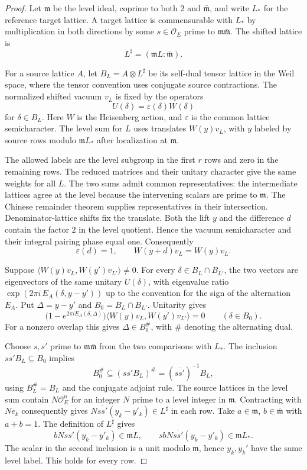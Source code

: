 \begin{proof}
Let \(\mathfrak m\) be the level ideal, coprime to both
\(2\) and \(\bar{\mathfrak m}\), and write \(L_*\) for the reference
target lattice. A target lattice is commensurable with
\(L_*\) by multiplication in both directions by some
\(s\in\mathcal O_E\) prime to \(\mathfrak m\bar{\mathfrak m}\).
The shifted lattice is
\[
 L^{\sharp}=(\mathfrak m L:\bar{\mathfrak m}).
\]

For a source lattice \(A\), let
\(B_L=A\otimes L^{\sharp}\) be its self-dual tensor lattice
in the Weil space, where the tensor convention uses
conjugate source contractions. The normalized shifted
vacuum \(v_L\) is fixed by the operators
\[
 U(\delta)=\varepsilon(\delta)W(\delta)
\]
for
\(\delta\in B_L\). Here \(W\) is the Heisenberg action,
and \(\varepsilon\) is the common lattice semicharacter.
The level sum for \(L\) uses translates \(W(y)v_L\),
with \(y\) labeled by source rows modulo \(\mathfrak m L_*\)
after localization at \(\mathfrak m\).

The allowed labels
are the level subgroup in the first \(r\) rows and zero
in the remaining rows. The reduced matrices and their
unitary character give the same weights for all \(L\).
The two sums admit common representatives: the intermediate lattices agree at the level because the intervening scalars are prime to \(\mathfrak m\). The Chinese remainder theorem supplies representatives in their intersection. Denominator-lattice shifts fix the translate. Both the lift \(y\) and the difference \(d\) contain the factor \(2\) in the level quotient. Hence the vacuum semicharacter and their integral pairing phase equal one. Consequently
\[
 \varepsilon(d)=1,\qquad W(y+d)v_L=W(y)v_L.
\]


Suppose \(\langle W(y)v_L,W(y')v_{L'}\rangle\ne0\). For every
\(\delta\in B_L\cap B_{L'}\), the two vectors are eigenvectors
of the same unitary \(U(\delta)\), with eigenvalue ratio
\(\exp(2\pi i\, E_A(\delta,y-y'))\) up to the convention for
the sign of the alternation \(E_A\). Put \(\Delta=y-y'\) and \(B_0=B_L\cap B_{L'}\).
Unitarity gives
\[
 \bigl(1-e^{2\pi i E_A(\delta,\Delta)}\bigr)
         \langle W(y)v_L,W(y')v_{L'}\rangle=0
       \qquad(\delta\in B_0).
\]
For a nonzero overlap this gives
\(\Delta\in B_0^\#\), with \(\#\) denoting the alternating
dual.

Choose \(s,s'\) prime to \(\mathfrak m\bar{\mathfrak m}\)
from the two comparisons with \(L_*\). The inclusion
\(ss' B_L\subseteq B_0\) implies
\[
 B_0^\#\subseteq(ss' B_L)^\#
             =(\overline{ss'})^{-1}B_L ,
\]
using \(B_L^\#=B_L\) and the conjugate adjoint rule. The source lattices in the
level sum contain \(N\mathcal O_E^n\) for an integer \(N\)
prime to a level integer in \(\mathfrak m\).
Contracting with \(Ne_k\) consequently gives
\(N\overline{ss'}(y_k-y'_k)\in L^{\sharp}\) in each row.
Take \(a\in\mathfrak m\), \(b\in\bar{\mathfrak m}\) with
\(a+b=1\). The definition of \(L^\sharp\) gives
\[
  bN\overline{ss'}(y_k-y'_k)\in\mathfrak m L,\qquad
  sbN\overline{ss'}(y_k-y'_k)\in\mathfrak m L_* .
\]
The scalar in the second inclusion is a unit modulo
\(\mathfrak m\), hence \(y_k,y_k'\) have the same level
label. This holds for every row.


\end{proof}
